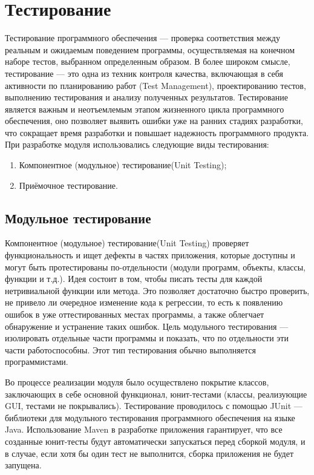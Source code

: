 \section{Тестирование}

Тестирование программного обеспечения --- проверка соответствия между реальным и ожидаемым поведением программы,
осуществляемая на конечном наборе тестов, выбранном определенным образом\cite{swebok}.
В более широком смысле, тестирование --- это одна из техник контроля качества, включающая в себя активности по
планированию работ (Test Management), проектированию тестов, выполнению тестирования и анализу полученных результатов.
Тестирование является важным и неотъемлемым этапом жизненного цикла программного обеспечения, оно позволяет выявить
ошибки уже на ранних стадиях разработки, что сокращает время разработки и повышает надежность программного продукта.
При разработке модуля использовались следующие виды тестирования:

\begin{enumerate}
\item Компонентное (модульное) тестирование(Unit Testing);
\item Приёмочное тестирование.
\end{enumerate}

\subsection{Модульное тестирование}

Компонентное (модульное) тестирование(Unit Testing) проверяет функциональность и ищет дефекты в частях
приложения, которые доступны и могут быть протестированы по-отдельности (модули программ, объекты, классы, функции
и т.д.)\cite{bek}. Идея состоит в том, чтобы писать тесты для каждой нетривиальной функции или метода. Это позволяет достаточно
быстро проверить, не привело ли очередное изменение кода к регрессии, то есть к появлению ошибок в уже оттестированных
местах программы, а также облегчает обнаружение и устранение таких ошибок. Цель модульного тестирования --- изолировать
отдельные части программы и показать, что по отдельности эти части работоспособны. Этот тип тестирования обычно
выполняется программистами\cite{stress}.

Во процессе реализации модуля было осуществлено покрытие классов, заключающих в себе основной функционал, юнит-тестами
(классы, реализующие GUI, тестами не покрывались). Тестирование проводилось с помощью JUnit ---  библиотеки для
модульного тестирования программного обеспечения на языке Java. Использование Maven в разработке приложения гарантирует,
что все созданные юнит-тесты будут автоматически запускаться перед сборкой модуля, и в случае, если хотя бы один тест не
выполнится, сборка приложения не будет запущена.

